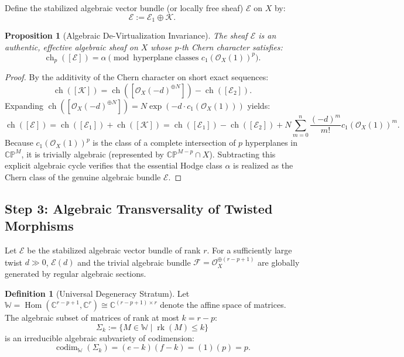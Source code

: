\documentclass[11pt,reqno]{article}
\newtheorem{proposition}[theorem]{Proposition}
\theoremstyle{definition}
\newtheorem{definition}[theorem]{Definition}
\DeclareMathOperator{\ch}{ch}
\DeclareMathOperator{\Hom}{Hom}
\DeclareMathOperator{\rk}{rk}
\DeclareMathOperator{\codim}{codim}
\begin{document}
Define the stabilized algebraic vector bundle (or locally free sheaf) $\mathcal{E}$ on $X$ by:
\begin{equation}
\mathcal{E} := \mathcal{E}_1 \oplus \mathcal{K}.
\end{equation}

\begin{proposition}[Algebraic De-Virtualization Invariance]
The sheaf $\mathcal{E}$ is an authentic, effective algebraic sheaf on $X$ whose $p$-th Chern character satisfies:
\begin{equation}
\ch_p([\mathcal{E}]) = \alpha \pmod{\text{hyperplane classes } c_1(\mathcal{O}_X(1))^p}.
\end{equation}
\end{proposition}

\begin{proof}
By the additivity of the Chern character on short exact sequences:
\begin{equation}
\ch([\mathcal{K}]) = \ch([\mathcal{O}_X(-d)^{\oplus N}]) - \ch([\mathcal{E}_2]).
\end{equation}
Expanding $\ch([\mathcal{O}_X(-d)^{\oplus N}]) = N \exp(-d \cdot c_1(\mathcal{O}_X(1)))$ yields:
\begin{equation}
\ch([\mathcal{E}]) = \ch([\mathcal{E}_1]) + \ch([\mathcal{K}]) = \ch([\mathcal{E}_1]) - \ch([\mathcal{E}_2]) + N \sum_{m=0}^n \frac{(-d)^m}{m!} c_1(\mathcal{O}_X(1))^m.
\end{equation}
Because $c_1(\mathcal{O}_X(1))^p$ is the class of a complete intersection of $p$ hyperplanes in $\mathbb{CP}^M$, it is trivially algebraic (represented by $\mathbb{CP}^{M-p} \cap X$). Subtracting this explicit algebraic cycle verifies that the essential Hodge class $\alpha$ is realized as the Chern class of the genuine algebraic bundle $\mathcal{E}$.
\end{proof}

\subsection{Step 3: Algebraic Transversality of Twisted Morphisms}
Let $\mathcal{E}$ be the stabilized algebraic vector bundle of rank $r$. For a sufficiently large twist $d \gg 0$, $\mathcal{E}(d)$ and the trivial algebraic bundle $\mathcal{F} = \mathcal{O}_X^{\oplus (r-p+1)}$ are globally generated by regular algebraic sections.

\begin{definition}[Universal Degeneracy Stratum]
Let $\mathbb{W} = \Hom(\mathbb{C}^{r-p+1}, \mathbb{C}^r) \cong \mathbb{C}^{(r-p+1) \times r}$ denote the affine space of matrices. The algebraic subset of matrices of rank at most $k = r - p$:
\begin{equation}
\Sigma_k := \{M \in \mathbb{W} \mid \rk(M) \le k\}
\end{equation}
is an irreducible algebraic subvariety of codimension:
\begin{equation}
\codim_\mathbb{W}(\Sigma_k) = (e - k)(f - k) = (1)(p) = p.
\end{equation}
\end{definition}
\end{document}
